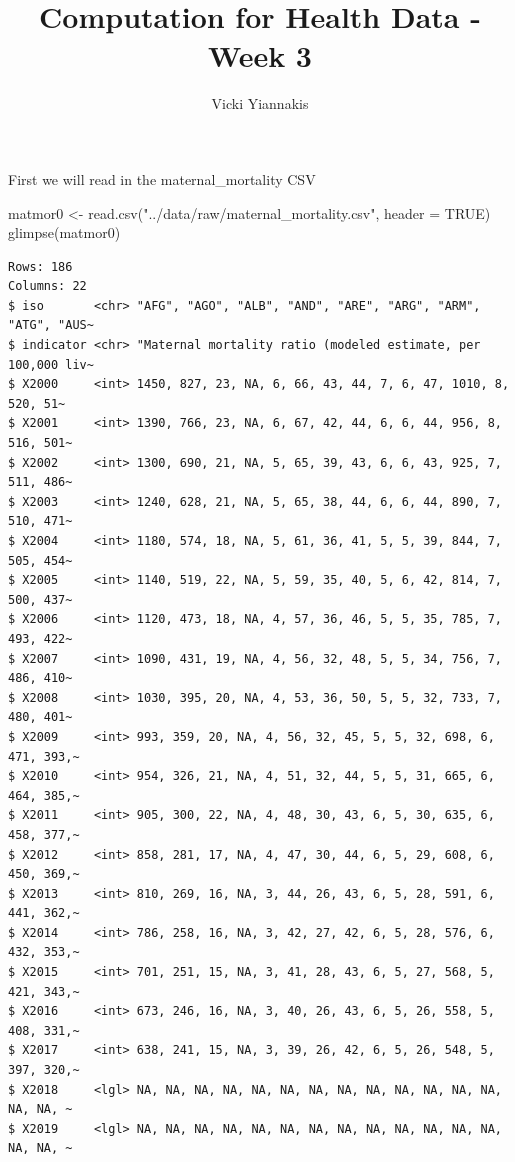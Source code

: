 \documentclass[
  letterpaper,
  DIV=11,
  numbers=noendperiod]{scrartcl}
\title{Computation for Health Data - Week 3}
\author{Vicki Yiannakis}
\date{}
\newenvironment{Shaded}{\begin{snugshade}}{\end{snugshade}}
\newcommand{\AttributeTok}[1]{\textcolor[rgb]{0.40,0.45,0.13}{#1}}
\newcommand{\ConstantTok}[1]{\textcolor[rgb]{0.56,0.35,0.01}{#1}}
\newcommand{\FunctionTok}[1]{\textcolor[rgb]{0.28,0.35,0.67}{#1}}
\newcommand{\NormalTok}[1]{\textcolor[rgb]{0.00,0.23,0.31}{#1}}
\newcommand{\OtherTok}[1]{\textcolor[rgb]{0.00,0.23,0.31}{#1}}
\newcommand{\StringTok}[1]{\textcolor[rgb]{0.13,0.47,0.30}{#1}}
\begin{document}
\maketitle


First we will read in the maternal\_mortality CSV

\begin{Shaded}
\begin{Highlighting}[]
\NormalTok{matmor0 }\OtherTok{\textless{}{-}} \FunctionTok{read.csv}\NormalTok{(}\StringTok{"../data/raw/maternal\_mortality.csv"}\NormalTok{, }\AttributeTok{header =} \ConstantTok{TRUE}\NormalTok{)}
\FunctionTok{glimpse}\NormalTok{(matmor0)}
\end{Highlighting}
\end{Shaded}

\begin{verbatim}
Rows: 186
Columns: 22
$ iso       <chr> "AFG", "AGO", "ALB", "AND", "ARE", "ARG", "ARM", "ATG", "AUS~
$ indicator <chr> "Maternal mortality ratio (modeled estimate, per 100,000 liv~
$ X2000     <int> 1450, 827, 23, NA, 6, 66, 43, 44, 7, 6, 47, 1010, 8, 520, 51~
$ X2001     <int> 1390, 766, 23, NA, 6, 67, 42, 44, 6, 6, 44, 956, 8, 516, 501~
$ X2002     <int> 1300, 690, 21, NA, 5, 65, 39, 43, 6, 6, 43, 925, 7, 511, 486~
$ X2003     <int> 1240, 628, 21, NA, 5, 65, 38, 44, 6, 6, 44, 890, 7, 510, 471~
$ X2004     <int> 1180, 574, 18, NA, 5, 61, 36, 41, 5, 5, 39, 844, 7, 505, 454~
$ X2005     <int> 1140, 519, 22, NA, 5, 59, 35, 40, 5, 6, 42, 814, 7, 500, 437~
$ X2006     <int> 1120, 473, 18, NA, 4, 57, 36, 46, 5, 5, 35, 785, 7, 493, 422~
$ X2007     <int> 1090, 431, 19, NA, 4, 56, 32, 48, 5, 5, 34, 756, 7, 486, 410~
$ X2008     <int> 1030, 395, 20, NA, 4, 53, 36, 50, 5, 5, 32, 733, 7, 480, 401~
$ X2009     <int> 993, 359, 20, NA, 4, 56, 32, 45, 5, 5, 32, 698, 6, 471, 393,~
$ X2010     <int> 954, 326, 21, NA, 4, 51, 32, 44, 5, 5, 31, 665, 6, 464, 385,~
$ X2011     <int> 905, 300, 22, NA, 4, 48, 30, 43, 6, 5, 30, 635, 6, 458, 377,~
$ X2012     <int> 858, 281, 17, NA, 4, 47, 30, 44, 6, 5, 29, 608, 6, 450, 369,~
$ X2013     <int> 810, 269, 16, NA, 3, 44, 26, 43, 6, 5, 28, 591, 6, 441, 362,~
$ X2014     <int> 786, 258, 16, NA, 3, 42, 27, 42, 6, 5, 28, 576, 6, 432, 353,~
$ X2015     <int> 701, 251, 15, NA, 3, 41, 28, 43, 6, 5, 27, 568, 5, 421, 343,~
$ X2016     <int> 673, 246, 16, NA, 3, 40, 26, 43, 6, 5, 26, 558, 5, 408, 331,~
$ X2017     <int> 638, 241, 15, NA, 3, 39, 26, 42, 6, 5, 26, 548, 5, 397, 320,~
$ X2018     <lgl> NA, NA, NA, NA, NA, NA, NA, NA, NA, NA, NA, NA, NA, NA, NA, ~
$ X2019     <lgl> NA, NA, NA, NA, NA, NA, NA, NA, NA, NA, NA, NA, NA, NA, NA, ~
\end{verbatim}
\end{document}
